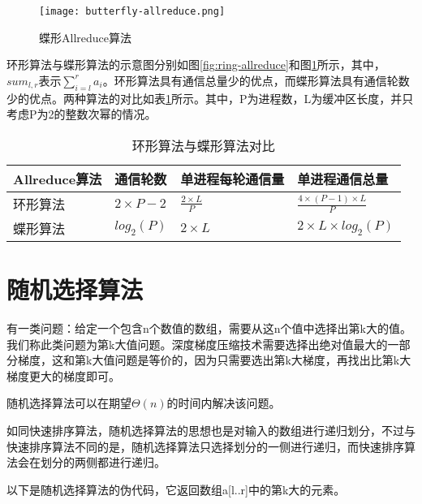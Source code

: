 \begin{figure}[ht] %
    \centering
    \texttt{[image: butterfly-allreduce.png]}
    \caption{蝶形Allreduce算法}
    \label{fig:butter-allreduce}
\end{figure}


环形算法与蝶形算法的示意图分别如图\ref{fig:ring-allreduce}和图\ref{fig:butter-allreduce}所示，其中，$sum_{l,r}$表示$\sum_{i = l}^r a_i$。环形算法具有通信总量少的优点，而蝶形算法具有通信轮数少的优点。两种算法的对比如表\ref{tab:Allreduce}所示。其中，P为进程数，L为缓冲区长度，并只考虑P为2的整数次幂的情况。

\begin{table}[htb]
    \centering
    \caption[环形算法与蝶形算法对比]{环形算法与蝶形算法对比}
    \label{tab:Allreduce}
    \begin{tabularx}{\linewidth}{lXXX}
        \toprule[1.5pt]
        {Allreduce算法} & {通信轮数} & {单进程每轮通信量} & {单进程通信总量}\\\midrule[1pt]
        环形算法 & $2 \times P - 2$ & $\frac{2 \times L}{P}$ & $ \frac{4 \times (P - 1)\times L}{P}$\\
        蝶形算法 & $log_2(P)$ & $2\times L$ & $2 \times L \times log_2(P)$\\
        \bottomrule[1.5pt]
    \end{tabularx}
\end{table}

\section{随机选择算法}
有一类问题：给定一个包含n个数值的数组，需要从这n个值中选择出第k大的值。我们称此类问题为第k大值问题。深度梯度压缩技术需要选择出绝对值最大的一部分梯度，这和第k大值问题是等价的，因为只需要选出第k大梯度，再找出比第k大梯度更大的梯度即可。

随机选择算法\cite{IntroToAlgo}可以在期望$\Theta(n)$的时间内解决该问题。

如同快速排序算法，随机选择算法的思想也是对输入的数组进行递归划分，不过与快速排序算法不同的是，随机选择算法只选择划分的一侧进行递归，而快速排序算法会在划分的两侧都进行递归。

以下是随机选择算法的伪代码，它返回数组a[l..r]中的第k大的元素。


